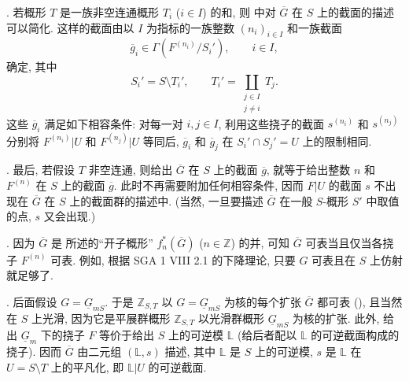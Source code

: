 \medskip
\noindent {}. 若概形 $T$ 是一族非空连通概形 $T_i$ ($i\in I$) 的和, 则  中对 $\overline G$ 在 $S$ 上的截面的描述可以简化. 这样的截面由以 $I$ 为指标的一族整数 $(n_i)_{i\in I}$ 和一族截面
\[
 \overline g_i\in\Gamma(F^{(n_i)}/S_i'),\qquad i\in I,
\]
确定, 其中
\[
 S_i'=S\setminus T_i',
 \qquad
 T_i'=\coprod_{\substack{j\in I\\j\ne i}}T_j.
\]
这些 $\overline g_i$ 满足如下相容条件: 对每一对 $i,j\in I$, 利用这些挠子的截面 $s^{(n_i)}$ 和 $s^{(n_j)}$ 分别将 $F^{(n_i)}|U$ 和 $F^{(n_j)}|U$ 等同后, $\overline g_i$ 和 $\overline g_j$ 在 $S_i'\cap S_j'=U$ 上的限制相同.

\medskip
\noindent {}. 最后, 若假设 $T$ 非空连通, 则给出 $\overline G$ 在 $S$ 上的截面 $\overline g$, 就等于给出整数 $n$ 和 $F^{(n)}$ 在 $S$ 上的截面 $\overline g$. 此时不再需要附加任何相容条件, 因而 $F|U$ 的截面 $s$ 不出现在 $\overline G$ 在 $S$ 上的截面群的描述中. (当然, 一旦要描述 $\overline G$ 在一般 $S$-概形 $S'$ 中取值的点, $s$ 又会出现.)

\medskip
\noindent {}. 因为 $\overline G$ 是  所述的“开子概形” $f_n^*(\overline G)$ ($n\in\mathbb Z$) 的并, 可知 $\overline G$ 可表当且仅当各挠子 $F^{(n)}$ 可表. 例如, 根据 SGA 1 VIII 2.1 的下降理论, 只要 $G$ 可表且在 $S$ 上仿射就足够了.



\medskip
\noindent {}. 后面假设 $G=\underline G_{mS}$. 于是 $\mathbb Z_{S,T}$ 以 $G=\underline G_{mS}$ 为核的每个扩张 $\overline G$ 都可表 (), 且当然在 $S$ 上光滑, 因为它是平展群概形 $\mathbb Z_{S,T}$ 以光滑群概形 $\underline G_{mS}$ 为核的扩张. 此外, 给出 $\underline G_m$ 下的挠子 $F$ 等价于给出 $S$ 上的可逆模 $\mathbb L$ (给后者配以 $\mathbb L$ 的可逆截面构成的挠子). 因而 $\overline G$ 由二元组 $(\mathbb L,s)$ 描述, 其中 $\mathbb L$ 是 $S$ 上的可逆模, $s$ 是 $\mathbb L$ 在 $U=S\setminus T$ 上的平凡化, 即 $\mathbb L|U$ 的可逆截面.

